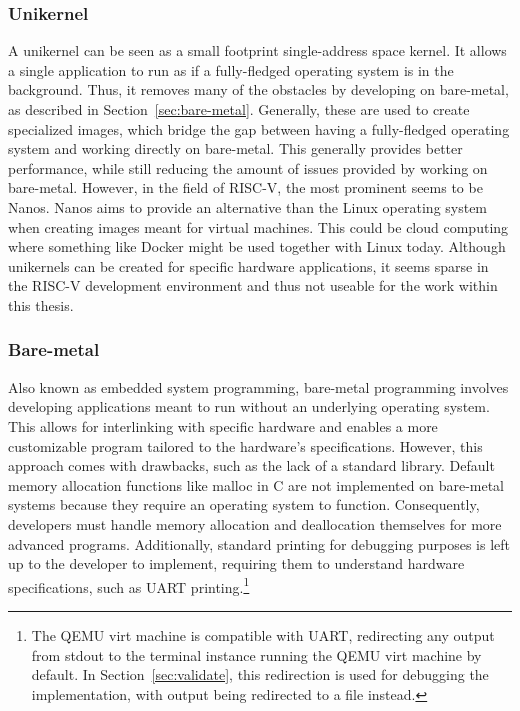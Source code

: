\subsubsection*{Unikernel}
A unikernel can be seen as a small footprint single-address space kernel. It
allows a single application to run as if a fully-fledged operating system is in
the background. Thus, it removes many of the obstacles by developing on
bare-metal, as described in Section~\ref{sec:bare-metal}. Generally, these are
used to create specialized images, which bridge the gap between having a
fully-fledged operating system and working directly on bare-metal. This
generally provides better performance, while still reducing the amount of issues
provided by working on bare-metal. However, in the field of RISC-V, the most
prominent seems to be Nanos. Nanos aims to provide an alternative than the Linux
operating system when creating images meant for virtual machines. This could be
cloud computing where something like Docker might be used together with Linux
today. Although unikernels can be created for specific hardware applications, it
seems sparse in the RISC-V development environment and thus not useable for the
work within this thesis.

\subsubsection*{Bare-metal}
Also known as embedded system programming, bare-metal programming involves
developing applications meant to run without an underlying operating system.
This allows for interlinking with specific hardware and enables a more
customizable program tailored to the hardware's specifications. However, this
approach comes with drawbacks, such as the lack of a standard library. Default
memory allocation functions like malloc in C are not implemented on bare-metal
systems because they require an operating system to function. Consequently,
developers must handle memory allocation and deallocation themselves for more
advanced programs. Additionally, standard printing for debugging purposes is
left up to the developer to implement, requiring them to understand hardware
specifications, such as UART printing.\footnote{The QEMU virt machine is
  compatible with UART, redirecting any output from stdout to the terminal
instance running the QEMU virt machine by default. In
Section~\ref{sec:validate}, this redirection is used for debugging the
implementation, with output being redirected to a file instead.}
\cite{uart}

